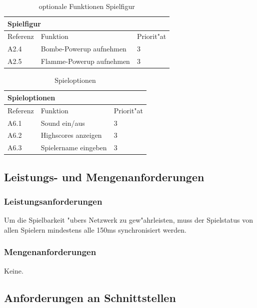 \begin{table}[H]
  \begin{center}
    \begin{tabular}{|p{20mm}|p{85mm}|p{20mm}|}
    \multicolumn{3}{l}{\textbf{Spielfigur}} \\
    \hline Referenz & Funktion & Priorit"at \\
    \hline A2.4 & Bombe-Powerup aufnehmen & 3 \\
    \hline A2.5 & Flamme-Powerup aufnehmen & 3 \\
    \hline
    \end{tabular}
  \end{center}
  \caption{optionale Funktionen Spielfigur}
\end{table}


\begin{table}[H]
  \begin{center}
    \begin{tabular}{|p{20mm}|p{85mm}|p{20mm}|}
    \multicolumn{3}{l}{\textbf{Spieloptionen}} \\
    \hline Referenz & Funktion & Priorit"at \\
    \hline A6.1 & Sound ein/aus & 3 \\
    \hline A6.2 & Highscores anzeigen & 3 \\
    \hline A6.3 & Spielername eingeben & 3 \\
    \hline
    \end{tabular}
  \end{center}
  \caption{Spieloptionen}
\end{table}


\subsection{Leistungs- und Mengenanforderungen}
\label{LeistungsAnforderungen}
\subsubsection{Leistungsanforderungen}
Um die Spielbarkeit "ubers Netzwerk zu gew"ahrleisten, muss der Spielstatus von allen Spielern mindestens
alle 150ms synchronisiert werden.

\subsubsection{Mengenanforderungen}
Keine.

\subsection{Anforderungen an Schnittstellen}

